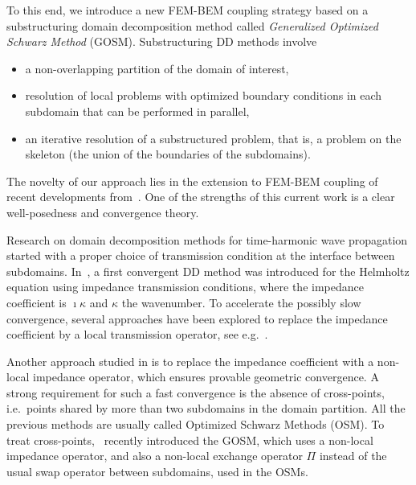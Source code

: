 \documentclass[a4paper,11pt]{article}
\begin{document}
To this end, we introduce a new FEM-BEM coupling strategy based on a substructuring domain decomposition method called \emph{Generalized Optimized Schwarz Method} (GOSM). Substructuring DD methods involve
\begin{itemize}
  \item a non-overlapping partition of the domain of interest,
  \item resolution of local problems with optimized boundary conditions in each subdomain that can be performed in parallel,
  \item an iterative resolution of a substructured problem, that is, a problem on the skeleton (the union of the boundaries of the subdomains).
\end{itemize}
The novelty of our approach lies in the extension to FEM-BEM coupling of recent developments from~\cite{MR4433119,MR4665035}. One of the strengths of this current work is a clear well-posedness and convergence theory.

Research on domain decomposition methods for time-harmonic wave propagation started with a proper choice of transmission condition at the interface between subdomains. In~\cite{Despres1991DDM}, a first convergent DD method was introduced for the Helmholtz equation using impedance transmission conditions, where the impedance coefficient is \(\imath \kappa\) and \(\kappa\) the wavenumber. To accelerate the possibly slow convergence, several approaches have been explored to replace the impedance coefficient by a local transmission operator, see e.g.~\cite{GanderMagoulesEtAl2002OSM,BoubendirAntoineEtAl2012QON}.

Another approach studied in \cite{CollinoGhanemiEtAl2000DDM} is to replace the impedance coefficient with a non-local impedance operator, which ensures provable geometric convergence. A strong requirement for such a fast convergence is the absence of cross-points, i.e.\ points shared by more than two subdomains in the domain partition. All the previous methods are usually called Optimized Schwarz Methods (OSM). To treat cross-points,~\cite{MR4433119,MR4665035} recently introduced the GOSM, which uses a non-local impedance operator, and also a non-local exchange operator \(\Pi\) instead of the usual swap operator between subdomains, used in the OSMs.
\end{document}
